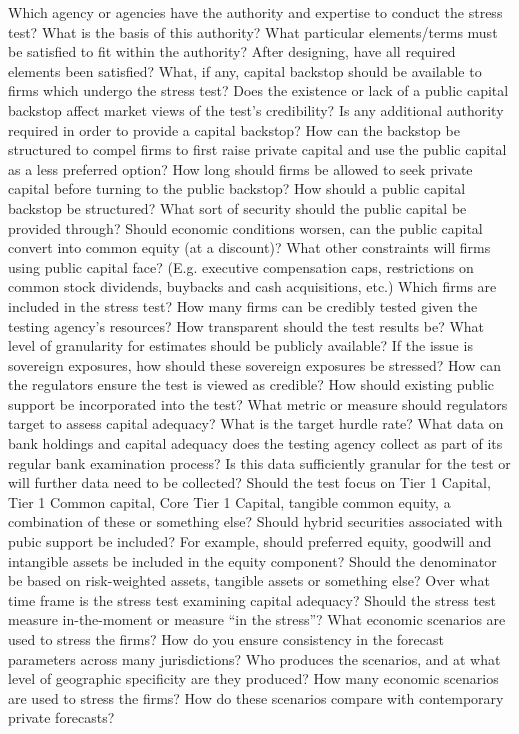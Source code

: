 \documentclass[12pt]{article}
\begin{document}
\begin{outline}[enumerate]
\1 Which agency or agencies have the authority and expertise to conduct the stress test?
\2 What is the basis of this authority?
\2 What particular elements/terms must be satisfied to fit within the authority?
\2 After designing, have all required elements been satisfied?
\1 What, if any, capital backstop should be available to firms which undergo the stress test?
\2 Does the existence or lack of a public capital backstop affect market views of the test's credibility?
\2 Is any additional authority required in order to provide a capital backstop?
\2 How can the backstop be structured to compel firms to first raise private capital and use the public capital as a less preferred option?
\2 How long should firms be allowed to seek private capital before turning to the public backstop?
\1 How should a public capital backstop be structured?
\2 What sort of security should the public capital be provided through?
\2 Should economic conditions worsen, can the public capital convert into common equity (at a discount)?
\2 What other constraints will firms using public capital face? (E.g. executive compensation caps, restrictions on common stock dividends, buybacks and cash acquisitions, etc.)
\1 Which firms are included in the stress test?
\2 How many firms can be credibly tested given the testing agency's resources?
\1 How transparent should the test results be? What level of granularity for estimates should be publicly available?
\2 If the issue is sovereign exposures, how should these sovereign exposures be stressed?
\1 How can the regulators ensure the test is viewed as credible?
\2 How should existing public support be incorporated into the test?
\2 What metric or measure should regulators target to assess capital adequacy?
\3 What is the target hurdle rate?
\3 What data on bank holdings and capital adequacy does the testing agency collect as part of its regular bank examination process? Is this data sufficiently granular for the test or will further data need to be collected?
\3 Should the test focus on Tier 1 Capital, Tier 1 Common capital, Core Tier 1 Capital, tangible common equity, a combination of these or something else?
\4 Should hybrid securities associated with pubic support be included?
\4 For example, should preferred equity, goodwill and intangible assets be included in the equity component?
\4 Should the denominator be based on risk-weighted assets, tangible assets or something else?
\1 Over what time frame is the stress test examining capital adequacy?
\2 Should the stress test measure in-the-moment or measure ``in the stress''?
\1 What economic scenarios are used to stress the firms?
\2 How do you ensure consistency in the forecast parameters across many jurisdictions?
\2 Who produces the scenarios, and at what level of geographic specificity are they produced?
\2 How many economic scenarios are used to stress the firms?
\2 How do these scenarios compare with contemporary private forecasts?

\end{outline}
\end{document}

